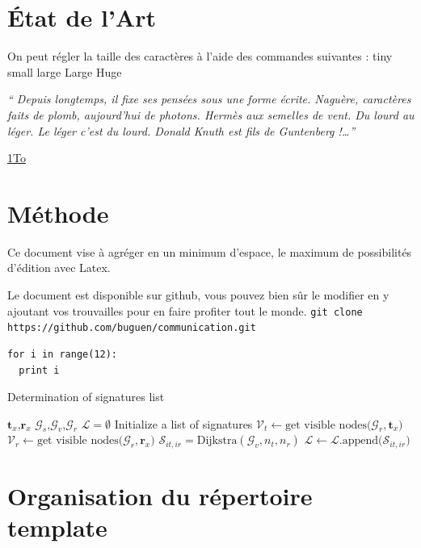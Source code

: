 \documentclass[twocolumn,a4paper]{IEEEtranfr}
\newcommand{\mc}[1]{\mathcal{#1}}
\begin{document}
\section{État de l'Art} 
On peut régler la taille des caractères à l'aide des commandes suivantes : 
{\tiny tiny \small small \large large \Large Large \Huge Huge}
\par
{\textit
{`` Depuis longtemps, il fixe ses pensées sous une forme écrite.
Naguère, caractères faits de plomb, aujourd'hui de photons. Hermès aux semelles de vent. Du lourd au léger. Le léger c'est du lourd. 
Donald Knuth est fils de Guntenberg !\dots''}

\href{http://micro.lemondeinformatique.fr/nouveaux-produits/lire-datatraveler-hyperx-predator-19600.html}{1To}
\section{Méthode}

Ce document vise à agréger en un minimum d'espace, le maximum de possibilités
d'édition avec Latex.

Le document est disponible sur github,  vous pouvez bien sûr le modifier en y ajoutant
vos trouvailles pour en faire profiter tout le monde.
{\tt git clone https://github.com/buguen/communication.git}
\begin{lstlisting}
for i in range(12):
  print i
\end{lstlisting}

\begin{algorithm}               %
\label{alg1}                           %
\caption{Determination of signatures list}
\begin{algorithmic}                    %
\REQUIRE $\mathbf{t}_x$,$\mathbf{r}_x$
\REQUIRE $\mc{G}_s$,$\mc{G}_v$,$\mc{G}_r$
\STATE $\mathcal{L} = \emptyset $ Initialize a list of signatures
\STATE $\mathcal{V}_t \leftarrow \textrm{get visible nodes(}\mc{G}_r,\mathbf{t}_x\textrm{)}$
\STATE $\mathcal{V}_r \leftarrow \textrm{get visible nodes(}\mc{G}_r,\mathbf{r}_x\textrm{)}$
\STATE $\mc{S}_{it,ir}  = \textrm{Dijkstra}(\mc{G}_v,n_t,n_r)$
\STATE $\mathcal{L}\leftarrow \mathcal{L}.\textrm{append(}\mc{S}_{it,ir}\textrm{)}$
\ENDFOR
\ENDFOR
\end{algorithmic}
\end{algorithm}

\section{Organisation du répertoire template}

}
\end{document}
